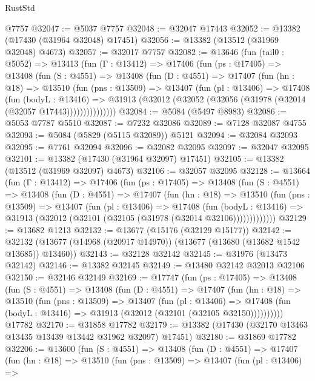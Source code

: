 \begin{lexlean}{RustStd}
\begin{coremodule}
    @7757
@32047 := @5037 @7757
@32048 := @32047 @17443
@32052 := @13382 (@17430 (@31964 @32048) @17451)
@32056 := @13382 (@13512 (@31969 @32048) @4673)
@32057 := @32017 @7757
@32082 := @13646
    (fun (tail0 : @5052) =>
    @13413
      (fun (Γ : @13412) =>
      @17406
        (fun (ps : @17405) =>
        @13408
          (fun (S : @4551) =>
          @13408
            (fun (D : @4551) =>
            @17407
              (fun (hn : @18) =>
              @13510
                (fun (pns : @13509) =>
                @13407
                  (fun (pl : @13406) =>
                  @17408
                    (fun (bodyL : @13416) =>
                    @31913 (@32012 (@32052 (@32056 (@31978 (@32014 (@32057 @17443)))))))))))))))
@32084 := @5084 (@5497 @8983)
@32086 := @5053 @7787 @5510
@32087 := @7232 @32086
@32089 := @7128 @32087 @4755
@32093 := @5084 (@5829 (@5115 @32089)) @5121
@32094 := @32084 @32093
@32095 := @7761 @32094
@32096 := @32082 @32095
@32097 := @32047 @32095
@32101 := @13382 (@17430 (@31964 @32097) @17451)
@32105 := @13382 (@13512 (@31969 @32097) @4673)
@32106 := @32057 @32095
@32128 := @13664
    (fun (Γ : @13412) =>
    @17406
      (fun (ps : @17405) =>
      @13408
        (fun (S : @4551) =>
        @13408
          (fun (D : @4551) =>
          @17407
            (fun (hn : @18) =>
            @13510
              (fun (pns : @13509) =>
              @13407
                (fun (pl : @13406) =>
                @17408
                  (fun (bodyL : @13416) =>
                  @31913 (@32012 (@32101 (@32105 (@31978 (@32014 @32106)))))))))))))
@32129 := @13682 @1213
@32132 := @13677 (@15176 (@32129 @15177))
@32142 := @32132 (@13677 (@14968 (@20917 @14970)) (@13677 (@13680 (@13682 @1542 @13685)) @13460))
@32143 := @32128 @32142
@32145 := @31976 (@13473 @32142)
@32146 := @13382 @32145
@32149 := @13480 @32142 @32013 @32106
@32150 := @32146 @32149
@32169 := @17747
    (fun (ps : @17405) =>
    @13408
      (fun (S : @4551) =>
      @13408
        (fun (D : @4551) =>
        @17407
          (fun (hn : @18) =>
          @13510
            (fun (pns : @13509) =>
            @13407
              (fun (pl : @13406) =>
              @17408 (fun (bodyL : @13416) => @31913 (@32012 (@32101 (@32105 @32150))))))))))
    @17782
@32170 := @31858 @17782
@32179 := @13382 (@17430 (@32170 @13463 @13435 @13439 @13442 @31962 @32097) @17451)
@32180 := @31869 @17782
@32206 := @13600
    (fun (S : @4551) =>
    @13408
      (fun (D : @4551) =>
      @17407
        (fun (hn : @18) =>
        @13510
          (fun (pns : @13509) =>
          @13407
            (fun (pl : @13406) =>

\end{coremodule}
\end{lexlean}
